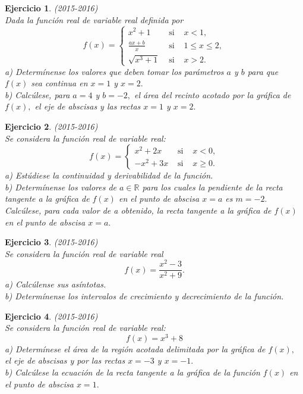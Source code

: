 \documentclass[12pt, a4paper]{amsart}
\newtheorem{ejer}{Ejercicio}
\begin{document}
\begin{ejer}\em (2015-2016)\\
Dada la función real de variable real definida por
\[f(x)=\left \{ \begin{matrix}
x^2+1 & \text{ si } & x<1,\\
\frac{ax+b}{x} & \text{ si } & 1\leq x\leq 2,\\
\sqrt{x^3+1} & \text{ si } &x>2.
\end{matrix}\right.\]
a) Determínense los valores que deben tomar los parámetros $a$ y $b$ para que $f (x)$ sea continua en $x = 1$ y $x = 2.$\\
b) Calcúlese, para $a = 4$ y $b = - 2,$ el área del recinto acotado por la gráfica de $f(x),$ el eje de abscisas y las rectas $x = 1$ y $x = 2.$
\end{ejer}

\begin{ejer}\em (2015-2016)\\
Se considera la función real de variable real:
\[f(x)=\left \{ \begin{matrix}
x^2+2x & \text{ si } & x<0,\\
-x^2+3x & \text{ si } & x\geq 0.
\end{matrix}\right.\]
a) Estúdiese la continuidad y derivabilidad de la función.\\
b) Determínense los valores de $a\in\mathbb{R}$ para los cuales la pendiente de la recta tangente a la gráfica de $f (x)$ en el punto de abscisa $x = a$ es $m = -2.$ Calcúlese, para cada valor de a obtenido, la recta tangente a la gráfica de $f (x)$ en el punto de abscisa $x = a.$
\end{ejer}

\begin{ejer}\em (2015-2016)\\
Se considera la función real de variable real
\[f(x)=\frac{x^2-3}{x^2+9}.\]
a) Calcúlense sus asíntotas.\\
b) Determínense los intervalos de crecimiento y decrecimiento de la función.
\end{ejer}

\begin{ejer}\em (2015-2016)\\
Se considera la función real de variable real:
\[f(x)=x^3+8\]
a) Determínese el área de la región acotada delimitada por la gráfica de $f(x),$ el eje de abscisas y por las rectas $x = - 3$ y $x = - 1.$\\
b) Calcúlese la ecuación de la recta tangente a la gráfica de la función $f(x)$ en el punto de abscisa $x = 1.$
\end{ejer}
\end{document}
